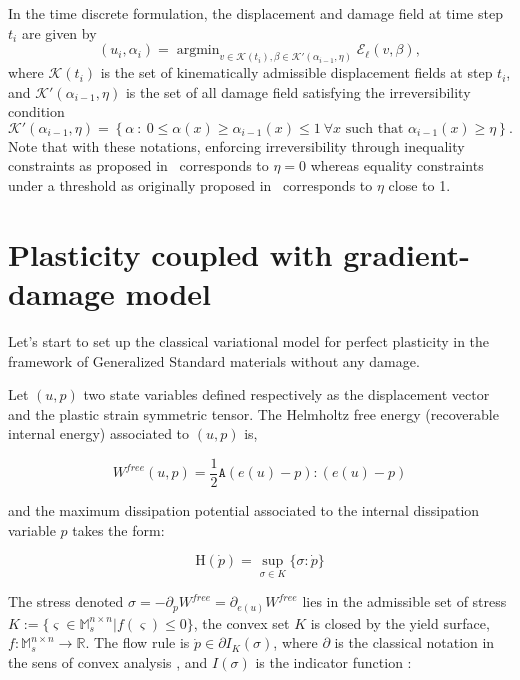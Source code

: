 \documentclass[10pt,oneside]{memoir}
\DeclareMathOperator*{\argmin}{argmin}
\begin{document}
 In the time discrete formulation, the displacement and damage field at time step $t_i$ are given by
\begin{equation}
	\label{eq:globMin}
	(u_i,\alpha_i) = \argmin_{v \in \mathcal{K}(t_i), \beta \in \mathcal{K}'(\alpha_{i-1},\eta)} \mathcal{E}_\ell(v,\beta),
\end{equation}
where $\mathcal{K}(t_i)$ is the set of kinematically admissible displacement fields at step $t_i$, and $\mathcal{K}'(\alpha_{i-1},\eta)$ is the set of all damage field satisfying the irreversibility condition
$$
	\mathcal{K}'(\alpha_{i-1},\eta) = \left\{\alpha \ :\  0 \le \alpha(x) \ge \alpha_{i-1}(x) \le 1 \ \forall x \text{ such that } \alpha_{i-1}(x) \ge \eta\right\}.
$$
Note that with these notations, enforcing irreversibility through inequality constraints as proposed in~\cite{Giacomini-2005,Amor-Marigo-EtAl-2008a,Pham-Amor-EtAl-2011a} corresponds to $\eta = 0$ whereas equality constraints under a threshold as originally proposed in~\cite{Bourdin-Francfort-EtAl-2000a} corresponds to $\eta$ close to 1.


\section{Plasticity coupled with gradient-damage model}

Let's start to set up the classical variational model for perfect plasticity in the framework of Generalized Standard materials without any damage.

Let $(u,p)$ two state variables defined respectively as the displacement vector and the plastic strain symmetric tensor. The Helmholtz free energy (recoverable internal energy) associated to $(u,p)$ is, 


$$ W^{free}(u,p)=\frac{1}{2}\mathtt{A} (e(u)-p):(e(u)-p) $$

and the maximum dissipation potential associated to the internal dissipation variable $p$ takes the form:

$$ \mathrm{H} (\dot{p})=\sup_{\sigma \in K} \{\sigma: \dot{p} \} $$

The stress denoted $\sigma= -\partial_p W^{free} = \partial_{e(u)} W^{free}$ lies in the admissible set of stress $K:=\{ \varsigma \in \mathbb{M}^{n\times n}_s | f(\varsigma) \leq 0 \}$, the convex set $K$ is closed by the yield surface, $f:\mathbb{M}^{n\times n}_s \rightarrow \mathbb{R}$. The flow rule is $\dot{p} \in \partial I_K(\sigma)$, where $\partial$ is the classical notation in the sens of convex analysis , and $I(\sigma) $ is the indicator function :
\end{document}
